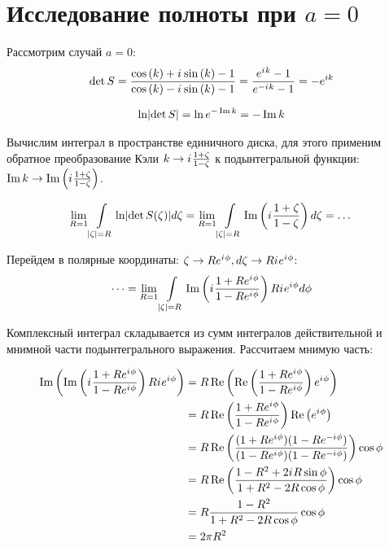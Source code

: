 \documentclass{nsart_eng}
\DeclarePairedDelimiter{\abs}{\lvert}{\rvert}
\newcommand{\eexp}[1]{e^{#1}}
\newcommand{\iu}{{i\mkern1mu}}
\renewcommand{\Re}{\operatorname{Re}}
\renewcommand{\Im}{\operatorname{Im}}
\begin{document}
\section{Исследование полноты при $a=0$}
Рассмотрим случай $a=0$:
\[
\det S
= \frac
{\cos\left(k\right) + \iu \sin\left(k\right) - 1}
{\cos\left(k\right) - \iu \sin\left(k\right) - 1}
= \frac{\eexp{\iu k} - 1}{\eexp{-\iu k} - 1}
= -\eexp{i k}
\]

\[
\ln \abs{\det S} = \ln \eexp{- \Im k} = -\Im k
\]


Вычислим интеграл в пространстве единичного диска, для этого применим обратное преобразование Кэли $k \to \iu \frac{1 + \zeta}{1 - \zeta}$ к подынтегральной функции: $\Im k \to \Im \left( \iu \frac{1 + \zeta}{1 - \zeta} \right) $.

\[
  \lim\limits_{R = 1} \int\limits_{\abs{\zeta} = R} \ln \abs{\det S(\zeta)} d \zeta
= \lim\limits_{R = 1} \int\limits_{\abs{\zeta} = R} \Im \left( \iu \frac{1 + \zeta}{1 - \zeta} \right)  d\zeta = \dots
\]

Перейдем в полярные координаты: $\zeta \to R \eexp{\iu \phi}, d\zeta \to R \iu \eexp{\iu \phi}$:
\[
\dots = \lim\limits_{R = 1} \int\limits_{\abs{\zeta} = R} \Im \left( \iu \frac{1 + R \eexp{\iu \phi}}{1 - R \eexp{\iu \phi}} \right) R \iu \eexp{\iu \phi} d\phi
\]

Комплексный интеграл складывается из сумм интегралов действительной и мнимной части подынтегрального выражения. Рассчитаем мнимую часть:

\begin{align*}
\Im \left(  \Im \left( \iu \frac{1 + R \eexp{\iu \phi}}{1 - R \eexp{\iu \phi}} \right) R \iu \eexp{\iu \phi} \right)
 &= R \Re \left(  \Re \left( \frac{1 + R \eexp{\iu \phi}}{1 - R \eexp{\iu \phi}} \right) \eexp{\iu \phi} \right) \\
 &= R \Re \left( \frac{1 + R \eexp{\iu \phi}}{1 - R \eexp{\iu \phi}} \right) \Re \left(   \eexp{\iu \phi} \right) \\
 &= R \Re \left( \frac{(1 + R \eexp{\iu \phi}) (1 - R \eexp{-\iu \phi}) }{(1 - R \eexp{\iu \phi}) (1 - R \eexp{-\iu \phi})} \right) \cos \phi \\
 &= R \Re \left( \frac{1 - R^2 + 2 \iu R \sin \phi}{1 + R^2 - 2 R \cos \phi} \right) \cos \phi \\
 &= R \frac{1 - R^2}{1 + R^2 - 2 R \cos \phi} \cos \phi \\
 &= 2 \pi R^2
\end{align*}
\end{document}
